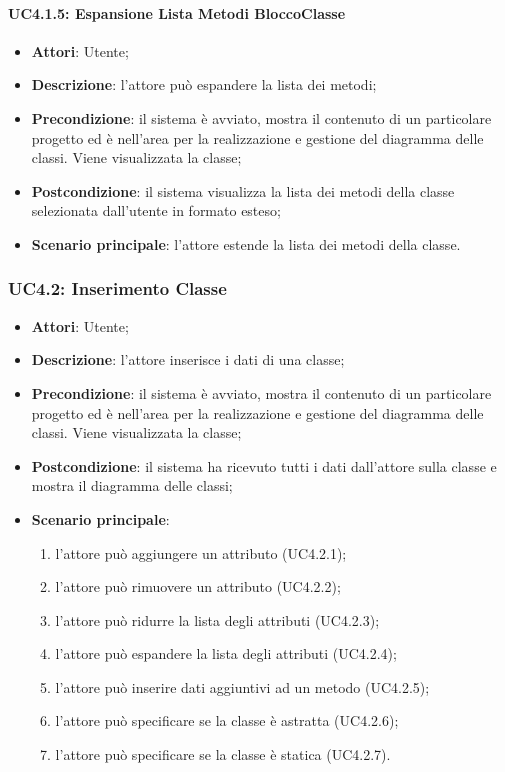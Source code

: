 \paragraph{UC4.1.5: Espansione Lista Metodi BloccoClasse}
\label{UC4.1.5}
\begin{itemize}
	\item \textbf{Attori}: Utente;
	\item \textbf{Descrizione}: l'attore può espandere la lista dei metodi;
	\item \textbf{Precondizione}: il sistema è avviato, mostra il contenuto di un particolare progetto ed è nell'area per la realizzazione e gestione del diagramma delle classi. Viene visualizzata la classe;
	\item \textbf{Postcondizione}: il sistema visualizza la lista dei metodi della classe selezionata dall'utente in formato esteso;
	\item \textbf{Scenario principale}: l'attore estende la lista dei metodi della classe.
\end{itemize}

\subsubsection{UC4.2: Inserimento Classe}
\label{UC4.2}
\begin{itemize}
	\item \textbf{Attori}: Utente;
	\item \textbf{Descrizione}: l'attore inserisce i dati di una classe;
	\item \textbf{Precondizione}: il sistema è avviato, mostra il contenuto di un particolare progetto ed è nell'area per la realizzazione e gestione del diagramma delle classi. Viene visualizzata la classe;
	\item \textbf{Postcondizione}: il sistema ha ricevuto tutti i dati dall'attore sulla classe e mostra il diagramma delle classi;
	\item \textbf{Scenario principale}:
	\begin{enumerate}
		\item l'attore può aggiungere un attributo (UC4.2.1);
		\item l'attore può rimuovere un attributo (UC4.2.2);
		\item l'attore può ridurre la lista degli attributi (UC4.2.3);
		\item l'attore può espandere la lista degli attributi (UC4.2.4);
		\item l'attore può inserire dati aggiuntivi ad un metodo (UC4.2.5);
		\item l'attore può specificare se la classe è astratta (UC4.2.6);
		\item l'attore può specificare se la classe è statica (UC4.2.7).
	\end{enumerate}
\end{itemize}

